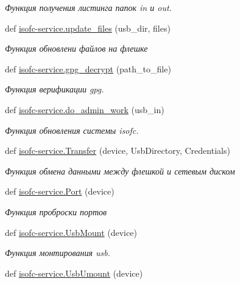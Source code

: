 \begin{DoxyCompactItemize}
\begin{DoxyCompactList}\small\item\em Функция получения листинга папок in и out. \end{DoxyCompactList}\item 
def \mbox{\hyperlink{isofc-service_8py_a50b9ec7706ed7d16a1a8a40d544e86da}{isofc-\/service.\+update\+\_\+files}} (usb\+\_\+dir, files)
\begin{DoxyCompactList}\small\item\em Функция обновлени файлов на флешке \end{DoxyCompactList}\item 
def \mbox{\hyperlink{isofc-service_8py_a439962da72c4d0e197a5e8247af9f379}{isofc-\/service.\+gpg\+\_\+decrypt}} (path\+\_\+to\+\_\+file)
\begin{DoxyCompactList}\small\item\em Функция верификации gpg. \end{DoxyCompactList}\item 
def \mbox{\hyperlink{isofc-service_8py_a2121e73bea9129e558eba2f542c9ae75}{isofc-\/service.\+do\+\_\+admin\+\_\+work}} (usb\+\_\+in)
\begin{DoxyCompactList}\small\item\em Функция обновления системы isofc. \end{DoxyCompactList}\item 
def \mbox{\hyperlink{isofc-service_8py_ac3a9b4525481c6bc4b39f8c382294cf3}{isofc-\/service.\+Transfer}} (device, Usb\+Directory, Credentials)
\begin{DoxyCompactList}\small\item\em Функция обмена данными между флешкой и сетевым диском \end{DoxyCompactList}\item 
def \mbox{\hyperlink{isofc-service_8py_ad9952a920fb26ea812b546c82bf64db4}{isofc-\/service.\+Port}} (device)
\begin{DoxyCompactList}\small\item\em Функция проброски портов \end{DoxyCompactList}\item 
def \mbox{\hyperlink{isofc-service_8py_ad24525bcc431f0f8c030e24bed019a6f}{isofc-\/service.\+Usb\+Mount}} (device)
\begin{DoxyCompactList}\small\item\em Функция монтирования usb. \end{DoxyCompactList}\item 
def \mbox{\hyperlink{isofc-service_8py_a8078bdb80f1dc3e035795dbceec779aa}{isofc-\/service.\+Usb\+Umount}} (device)

\end{DoxyCompactItemize}
